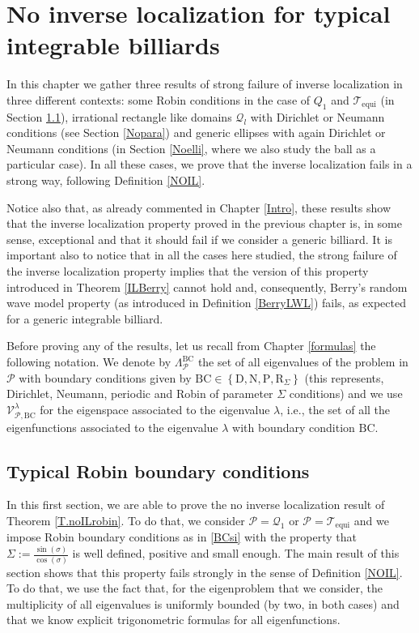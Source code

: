 \documentclass{amsart}
\theoremstyle{definition}
\theoremstyle{remark}
\numberwithin{equation}{section}
\theoremstyle{definition}
\theoremstyle{remark}
\begin{document}
\section{No inverse localization for typical integrable billiards} 
In this chapter we gather three results of strong failure of inverse localization in three different contexts: some Robin conditions in the case of $Q_1$ and $\mathcal{T}_{\mathrm{equi}}$ (in Section \ref{Robin}), irrational rectangle like domains $\mathcal{Q}_l$ with Dirichlet or Neumann conditions (see Section \ref{Nopara}) and generic ellipses with again Dirichlet or Neumann conditions (in Section \ref{Noelli}, where we also study the ball as a particular case). In all these cases, we prove that the inverse localization fails in a strong way, following Definition \ref{NOIL}. 

Notice also that, as already commented in Chapter \ref{Intro}, these results show that the inverse localization property proved in the previous chapter is, in some sense, exceptional and that it should fail if we consider a generic billiard. It is important also to notice that in all the cases here studied, the strong failure of the inverse localization property implies that the version of this property introduced in Theorem \ref{ILBerry} cannot hold and, consequently, Berry's random wave model property (as introduced in Definition \ref{BerryLWL}) fails, as expected for a generic integrable billiard. 

Before proving any of the results, let us recall from Chapter \ref{formulas} the following notation. We denote by $\Lambda_{\mathcal{P}}^{\mathrm{BC}}$ the set of all eigenvalues of the problem in $\mathcal{P}$ with boundary conditions given by $\mathrm{BC}\in\left\{\mathrm{D},\mathrm{N},\mathrm{P},\mathrm{R}_\Sigma\right\}$ (this represents, Dirichlet, Neumann, periodic and Robin of parameter $\Sigma$ conditions) and we use $\mathcal{V}_{\mathcal{P},\mathrm{BC}}^\lambda$ for the eigenspace associated to the eigenvalue $\lambda$, i.e., the set of all the eigenfunctions associated to the eigenvalue $\lambda$ with boundary condition $\mathrm{BC}$. 

\subsection{Typical Robin boundary conditions}\label{Robin}
In this first section, we are able to prove the no inverse localization result of Theorem \ref{T.noILrobin}. To do that, we consider $\mathcal{P}=\mathcal{Q}_1$ or $\mathcal{P}=\mathcal{T}_\mathrm{equi}$ and we impose Robin boundary conditions as in \eqref{BCsi} with the property that $\Sigma:=\frac{\sin(\sigma)}{\cos(\sigma)}$ is well defined, positive and small enough. The main result of this section shows that this property fails strongly in the sense of Definition \ref{NOIL}. To do that, we use the fact that, for the eigenproblem that we consider, the multiplicity of all eigenvalues is uniformly bounded (by two, in both cases) and that we know explicit trigonometric formulas for all eigenfunctions.
\end{document}
